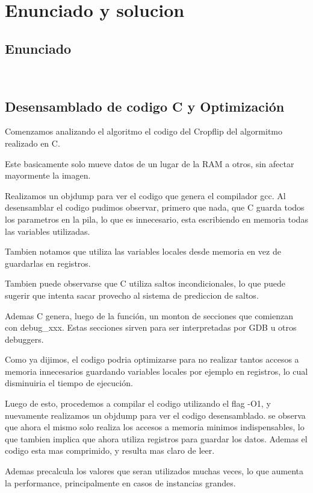 \documentclass[a4paper]{article}
\begin{document}
\section{Enunciado y solucion} 

\subsection{Enunciado}


\
\newpage

\subsection{Desensamblado de codigo C y Optimización}
Comenzamos analizando el algoritmo el codigo del Cropflip del algormitmo realizado en C.

Este basicamente solo mueve datos de un lugar de la RAM a otros, sin afectar mayormente la imagen.

Realizamos un objdump para ver el codigo que genera el compilador gcc. Al desensamblar el codigo pudimos observar, primero que nada, que C guarda todos los parametros en la pila, lo que es innecesario, esta escribiendo en memoria todas las variables utilizadas.

Tambien notamos que utiliza las variables locales desde memoria en vez de guardarlas en registros.

Tambien puede observarse que C utiliza saltos incondicionales, lo que puede sugerir que intenta sacar provecho al sistema de prediccion de saltos.

Ademas C genera, luego de la función, un monton de secciones que comienzan con debug_xxx. Estas secciones sirven para ser interpretadas por GDB u otros debuggers.

Como ya dijimos, el codigo podria optimizarse para no realizar tantos accesos a memoria innecesarios guardando variables locales por ejemplo en registros, lo cual disminuiria el tiempo de ejecución.

Luego de esto, procedemos a compilar el codigo utilizando el flag -O1, y nuevamente realizamos un objdump para ver el codigo desensamblado. se observa que ahora el mismo solo realiza los accesos a memoria minimos indispensables, lo que tambien implica que ahora utiliza registros para guardar los datos. Ademas el codigo esta mas comprimido, y resulta mas claro de leer.

Ademas precalcula los valores que seran utilizados muchas veces, lo que aumenta la performance, principalmente en casos de instancias grandes.
\end{document}

